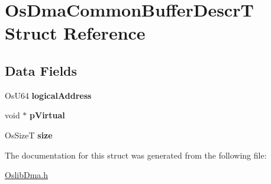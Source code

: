 \hypertarget{struct_os_dma_common_buffer_descr_t}{
\section{\-Os\-Dma\-Common\-Buffer\-Descr\-T \-Struct \-Reference}
\label{struct_os_dma_common_buffer_descr_t}
}
\subsection*{\-Data \-Fields}
\begin{DoxyCompactItemize}
\item 
\hypertarget{struct_os_dma_common_buffer_descr_t_aee18a45a385a3d797060b817734fa598}{
\-Os\-U64 {\bfseries logical\-Address}}
\label{struct_os_dma_common_buffer_descr_t_aee18a45a385a3d797060b817734fa598}

\item 
\hypertarget{struct_os_dma_common_buffer_descr_t_a59a555a04f21aa9153a74378273fa825}{
void $\ast$ {\bfseries p\-Virtual}}
\label{struct_os_dma_common_buffer_descr_t_a59a555a04f21aa9153a74378273fa825}

\item 
\hypertarget{struct_os_dma_common_buffer_descr_t_acd4dd33ca17c11c7d7b80d1a3d7d748c}{
\-Os\-Size\-T {\bfseries size}}
\label{struct_os_dma_common_buffer_descr_t_acd4dd33ca17c11c7d7b80d1a3d7d748c}

\end{DoxyCompactItemize}


\-The documentation for this struct was generated from the following file\-:\begin{DoxyCompactItemize}
\item 
\hyperlink{_oslib_dma_8h}{\-Oslib\-Dma.\-h}\end{DoxyCompactItemize}
